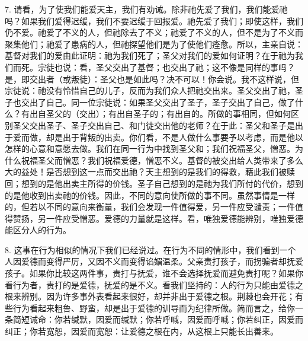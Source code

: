 7. 请看，为了使我们能爱天主，我们有劝诫。除非祂先爱了我们，我们能爱祂吗？如果我们爱得迟缓，我们不要迟缓于回报爱。祂先爱了我们；即使这样，我们仍不爱。祂爱了不义的人，但祂除去了不义；祂爱了不义的人，但不是为了不义而聚集他们；祂爱了患病的人，但祂探望他们是为了使他们痊愈。所以，主亲自说：基督对我们的爱由此证明：祂为我们死了；圣父对我们的爱如何证明？在于祂为我们而死。宗徒也说：看，圣父交出了基督；也交出了祂；这不像是同样的事吗？是，即交出者（或叛徒）：圣父也是如此吗？决不可以！你会说。我不这样说，但宗徒说：祂没有怜惜自己的儿子，反而为我们众人把祂交出来。圣父交出了祂，圣子也交出了自己。同一位宗徒说：如果圣父交出了圣子，圣子交出了自己，做了什么？有出自圣父的（交出）；有出自圣子的；有出自的。所做的事相同，但如何区别圣父交出圣子、圣子交出自己、和门徒交出他的老师？在于此：圣父和圣子是出于爱而做，却是出于背叛的出卖。你们看，不是人做什么事要予以考虑，而是他以怎样的心意和意愿去做。我们在同一行为中找到圣父和；我们祝福圣父，憎恶。为什么祝福圣父而憎恶？我们祝福爱德，憎恶不义。基督的被交出给人类带来了多么大的益处！是否想到这一点而交出祂？天主想到的是我们的得救，藉此我们被赎回；想到的是他出卖主所得的价钱。圣子自己想到的是祂为我们所付的代价，想到的是他收到出卖祂的价钱。因此，不同的意向使所做的事不同。虽然事情是一样的，但若以不同的意向来衡量，我们会发现一件值得爱，另一件应受谴责；一件值得赞扬，另一件应受憎恶。爱德的力量就是这样。看，唯独爱德能辨别，唯独爱德能区分人的行为。\par

8. 这事在行为相似的情况下我们已经说过。在行为不同的情形中，我们看到一个人因爱德而变得严厉，又因不义而变得谄媚温柔。父亲责打孩子，而拐骗者却抚爱孩子。如果你比较这两件事，责打与抚爱，谁不会选择抚爱而避免责打呢？如果你看行为者，责打的是爱德，抚爱的是不义。看我们坚持的：人的行为只能由爱德之根来辨别。因为许多事外表看起来很好，却并非出于爱德之根。荆棘也会开花；有些行为看起来粗鲁、野蛮，却是出于爱德的训导而为纪律所做。简而言之，给你一条简短诫命：你若缄默，因爱而缄默；你若呼喊，因爱而呼喊；你若纠正，因爱而纠正；你若宽恕，因爱而宽恕：让爱德之根在内，从这根上只能长出善来。\par

